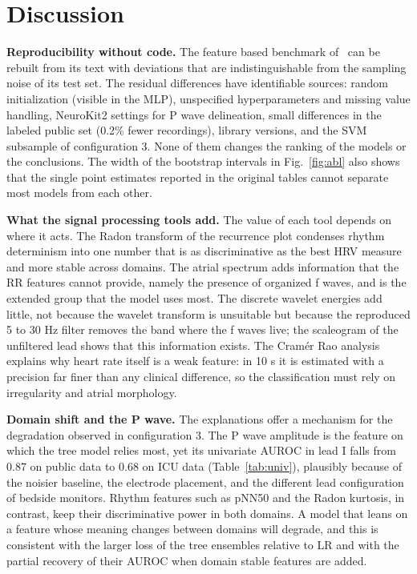 \documentclass[conference,a4paper]{IEEEtran}
\begin{document}
\section{Discussion}
\label{sec:discussion}

\noindent\textbf{Reproducibility without code.} The feature based benchmark of~\cite{nassar2025} can be rebuilt from its text with deviations that are indistinguishable from the sampling noise of its test set. The residual differences have identifiable sources: random initialization (visible in the MLP), unspecified hyperparameters and missing value handling, NeuroKit2 settings for P wave delineation, small differences in the labeled public set (0.2\% fewer recordings), library versions, and the SVM subsample of configuration 3. None of them changes the ranking of the models or the conclusions. The width of the bootstrap intervals in Fig.~\ref{fig:abl} also shows that the single point estimates reported in the original tables cannot separate most models from each other.

\noindent\textbf{What the signal processing tools add.} The value of each tool depends on where it acts. The Radon transform of the recurrence plot condenses rhythm determinism into one number that is as discriminative as the best HRV measure and more stable across domains. The atrial spectrum adds information that the RR features cannot provide, namely the presence of organized f waves, and is the extended group that the model uses most. The discrete wavelet energies add little, not because the wavelet transform is unsuitable but because the reproduced 5 to 30 Hz filter removes the band where the f waves live; the scaleogram of the unfiltered lead shows that this information exists. The Cramér Rao analysis explains why heart rate itself is a weak feature: in 10 s it is estimated with a precision far finer than any clinical difference, so the classification must rely on irregularity and atrial morphology.

\noindent\textbf{Domain shift and the P wave.} The explanations offer a mechanism for the degradation observed in configuration 3. The P wave amplitude is the feature on which the tree model relies most, yet its univariate AUROC in lead I falls from 0.87 on public data to 0.68 on ICU data (Table~\ref{tab:univ}), plausibly because of the noisier baseline, the electrode placement, and the different lead configuration of bedside monitors. Rhythm features such as pNN50 and the Radon kurtosis, in contrast, keep their discriminative power in both domains. A model that leans on a feature whose meaning changes between domains will degrade, and this is consistent with the larger loss of the tree ensembles relative to LR and with the partial recovery of their AUROC when domain stable features are added.
\end{document}
